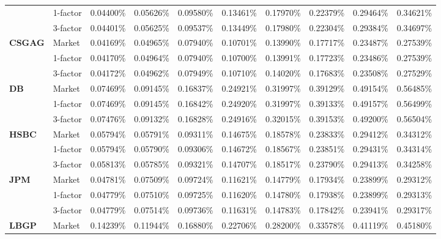 \documentclass[12pt,a4paper]{article}
\theoremstyle{plain}
\numberwithin{equation}{section}
\begin{document}
\begin{table}[t]
{\begin{tabular}{|rl|cccccccc|}
\cmidrule{3-10}          & 1-factor & 0.04400\% & 0.05626\% & 0.09580\% & 0.13461\% & 0.17970\% & 0.22379\% & 0.29464\% & 0.34621\% \\
          & 3-factor & 0.04401\% & 0.05625\% & 0.09537\% & 0.13449\% & 0.17980\% & 0.22304\% & 0.29384\% & 0.34697\% \\
    \midrule
    \midrule
    \multicolumn{1}{|l}{\textbf{CSGAG}} & Market & 0.04169\% & 0.04965\% & 0.07940\% & 0.10701\% & 0.13990\% & 0.17717\% & 0.23487\% & 0.27539\% \\
\cmidrule{3-10}          & 1-factor & 0.04170\% & 0.04964\% & 0.07940\% & 0.10700\% & 0.13991\% & 0.17723\% & 0.23486\% & 0.27539\% \\
          & 3-factor & 0.04172\% & 0.04962\% & 0.07949\% & 0.10710\% & 0.14020\% & 0.17683\% & 0.23508\% & 0.27529\% \\
    \midrule
    \midrule
    \multicolumn{1}{|l}{\textbf{DB}} & Market & 0.07469\% & 0.09145\% & 0.16837\% & 0.24921\% & 0.31997\% & 0.39129\% & 0.49154\% & 0.56485\% \\
\cmidrule{3-10}          & 1-factor & 0.07469\% & 0.09145\% & 0.16842\% & 0.24920\% & 0.31997\% & 0.39133\% & 0.49157\% & 0.56499\% \\
          & 3-factor & 0.07476\% & 0.09132\% & 0.16828\% & 0.24916\% & 0.32015\% & 0.39153\% & 0.49200\% & 0.56504\% \\
    \midrule
    \midrule
    \multicolumn{1}{|l}{\textbf{HSBC}} & Market & 0.05794\% & 0.05791\% & 0.09311\% & 0.14675\% & 0.18578\% & 0.23833\% & 0.29412\% & 0.34312\% \\
\cmidrule{3-10}          & 1-factor & 0.05794\% & 0.05790\% & 0.09306\% & 0.14672\% & 0.18567\% & 0.23851\% & 0.29431\% & 0.34314\% \\
          & 3-factor & 0.05813\% & 0.05785\% & 0.09321\% & 0.14707\% & 0.18517\% & 0.23790\% & 0.29413\% & 0.34258\% \\
    \midrule
    \midrule
    \multicolumn{1}{|l}{\textbf{JPM}} & Market & 0.04781\% & 0.07509\% & 0.09724\% & 0.11621\% & 0.14779\% & 0.17934\% & 0.23899\% & 0.29312\% \\
\cmidrule{3-10}          & 1-factor & 0.04779\% & 0.07510\% & 0.09725\% & 0.11620\% & 0.14780\% & 0.17938\% & 0.23899\% & 0.29313\% \\
          & 3-factor & 0.04779\% & 0.07514\% & 0.09736\% & 0.11631\% & 0.14783\% & 0.17842\% & 0.23941\% & 0.29317\% \\
    \midrule
    \midrule
    \multicolumn{1}{|l}{\textbf{LBGP}} & Market & 0.14239\% & 0.11944\% & 0.16880\% & 0.22706\% & 0.28200\% & 0.33578\% & 0.41119\% & 0.45180\% \\

\end{tabular}}
\end{table}
\end{document}
